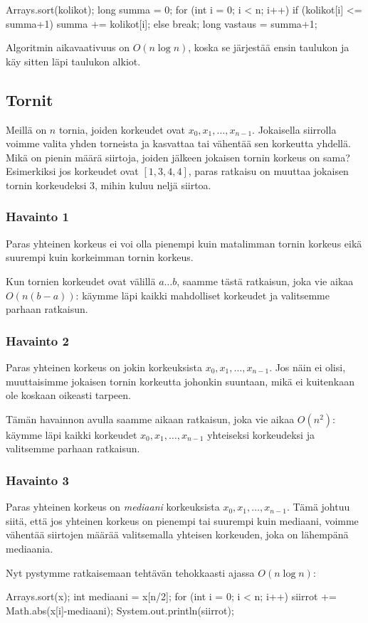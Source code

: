 \begin{code}
Arrays.sort(kolikot);
long summa = 0;
for (int i = 0; i < n; i++) {
    if (kolikot[i] <= summa+1) {
        summa += kolikot[i];
    } else {
        break;
    }
}
long vastaus = summa+1;
\end{code}

Algoritmin aikavaativuus on $O(n \log n)$, koska se
järjestää ensin taulukon ja käy sitten läpi taulukon alkiot.

\subsection{Tornit}

Meillä on $n$ tornia, joiden korkeudet ovat $x_0,x_1,\dots,x_{n-1}$.
Jokaisella siirrolla voimme valita yhden torneista ja
kasvattaa tai vähentää sen korkeutta yhdellä.
Mikä on pienin määrä siirtoja, joiden jälkeen jokaisen
tornin korkeus on sama?
Esimerkiksi jos korkeudet ovat $[1,3,4,4]$,
paras ratkaisu on muuttaa jokaisen tornin korkeudeksi $3$,
mihin kuluu neljä siirtoa.

\subsubsection{Havainto 1}

Paras yhteinen korkeus ei voi olla
pienempi kuin matalimman tornin korkeus eikä
suurempi kuin korkeimman tornin korkeus.

Kun tornien korkeudet ovat välillä $a \dots b$,
saamme tästä ratkaisun, joka vie aikaa $O(n (b-a))$:
käymme läpi kaikki mahdolliset korkeudet ja valitsemme
parhaan ratkaisun.

\subsubsection{Havainto 2}

Paras yhteinen korkeus on jokin korkeuksista $x_0,x_1,\dots,x_{n-1}$.
Jos näin ei olisi, muuttaisimme jokaisen tornin korkeutta
johonkin suuntaan, mikä ei kuitenkaan ole koskaan oikeasti tarpeen.

Tämän havainnon avulla saamme aikaan ratkaisun,
joka vie aikaa $O(n^2)$: käymme läpi kaikki korkeudet
$x_0,x_1,\dots,x_{n-1}$ yhteiseksi korkeudeksi ja valitsemme parhaan ratkaisun.

\subsubsection{Havainto 3}

Paras yhteinen korkeus on \emph{mediaani} korkeuksista
$x_0,x_1,\dots,x_{n-1}$.
Tämä johtuu siitä, että jos yhteinen korkeus on pienempi tai suurempi kuin mediaani,
voimme vähentää siirtojen määrää valitsemalla yhteisen korkeuden,
joka on lähempänä mediaania.

Nyt pystymme ratkaisemaan tehtävän tehokkaasti ajassa $O(n \log n)$:

\begin{code}
Arrays.sort(x);
int mediaani = x[n/2];
for (int i = 0; i < n; i++) {
    siirrot += Math.abs(x[i]-mediaani);
}
System.out.println(siirrot);
\end{code}
